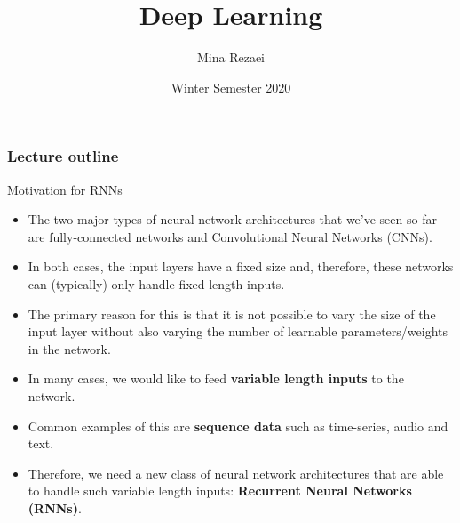 \documentclass[11pt,compress,t,notes=noshow]{beamer}
\title{Deep Learning}
\author{Mina Rezaei}
\institute{Department of Statistics -- LMU Munich}
\date{Winter Semester 2020}
\begin{document}




\begin{frame}
\frametitle{Lecture outline}
\tableofcontents
\end{frame}



\begin{frame} {Motivation for RNNs}
  \begin{itemize}
    \item The two major types of neural network architectures that we've seen so far are fully-connected networks and Convolutional Neural Networks (CNNs).
    \item In both cases, the input layers have a fixed size and, therefore, these networks can (typically) only handle fixed-length inputs.
    \item The primary reason for this is that it is not possible to vary the size of the input layer without also varying the number of learnable parameters/weights in the network.
    \item In many cases, we would like to feed \textbf{variable length inputs} to the network.
    \item Common examples of this are \textbf{sequence data} such as time-series, audio and text.
    \item Therefore, we need a new class of neural network architectures that are able to handle such variable length inputs: \textbf{Recurrent Neural Networks (RNNs)}.
  \end{itemize}
\end{frame}



 
\end{document}
